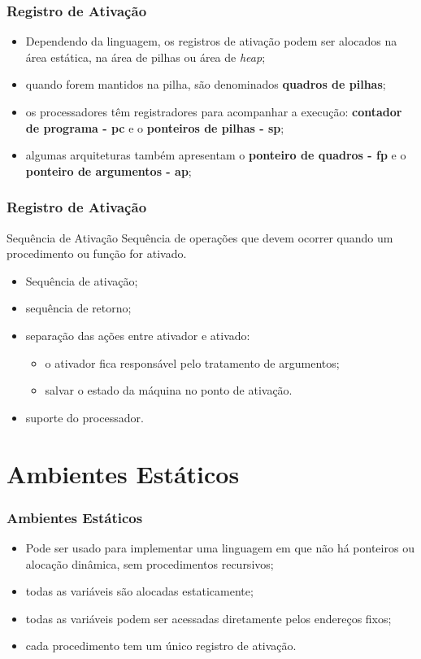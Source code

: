 \documentclass[table]{beamer}
\begin{document}
\begin{frame}
   \frametitle{Registro de Ativação}
   \begin{itemize}
      \item Dependendo da linguagem, os registros de ativação podem ser alocados na área estática, na área de pilhas ou área de \textit{heap};
      \item quando forem mantidos na pilha, são denominados \textbf{quadros de pilhas};
      \item os processadores têm registradores para acompanhar a execução: \textbf{contador de programa - pc} e o \textbf{ponteiros de pilhas - sp};
      \item algumas arquiteturas também apresentam o \textbf{ponteiro de quadros - fp} e o \textbf{ponteiro de argumentos - ap};
   \end{itemize}
\end{frame}

\begin{frame}
   \frametitle{Registro de Ativação}
   \begin{block}{Sequência de Ativação}
   Sequência de operações que devem ocorrer quando um procedimento ou função for ativado.
   \end{block}
   \begin{itemize}
      \item Sequência de ativação;
      \item sequência de retorno;
      \item separação das ações entre ativador e ativado:
      \begin{itemize}
         \item o ativador fica responsável pelo tratamento de argumentos;
	 \item salvar o estado da máquina no ponto de ativação.
      \end{itemize}
      \item suporte do processador.
   \end{itemize}
\end{frame}

\section{Ambientes Estáticos}
\begin{frame}
   \frametitle{Ambientes Estáticos}
   \begin{itemize}
      \item Pode ser usado para implementar uma linguagem em que não há ponteiros ou alocação dinâmica, sem procedimentos recursivos;
      \item todas as variáveis são alocadas estaticamente;
      \item todas as variáveis podem ser acessadas diretamente pelos endereços fixos;
      \item cada procedimento tem um único registro de ativação.
   \end{itemize}
\end{frame}
\end{document}
